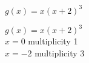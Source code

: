 {$g(x) = x(x + 2)^{3}$}
{ $g(x) = x(x + 2)^{3}$\\
$x = 0$ multiplicity 1\\
$x = -2$ multiplicity 3

\begin{center}
\end{center}}